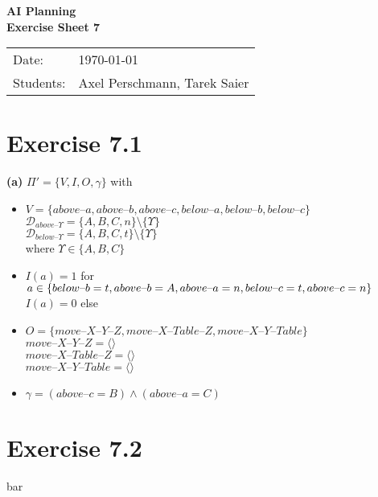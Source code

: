 \documentclass[11pt,a4paper]{article}
\newcommand{\sheetNr}{7}
\newcommand{\h}[0]{\text{--}}
\begin{document}
\begin{center}
\Huge{\textbf{AI Planning}}\\
\LARGE{\textbf{Exercise Sheet \sheetNr}}
\end{center}
\vspace{2cm}
\begin{tabular}{ll}
Date: & \today\\
Students: & Axel Perschmann, Tarek Saier
\end{tabular}

\section*{Exercise 7.1}
\textbf{(a)} $\Pi'=\{V,I,O,\gamma\}$ with\\
\begin{itemize}
\item $V=\{above\h a,above\h b,above\h c,below\h a,below\h b,below\h c\}$\\
$\mathscr{D}_{above\h\Upsilon}=\{A,B,C,n\}\setminus\{\Upsilon\}$\\
$\mathscr{D}_{below\h\Upsilon}=\{A,B,C,t\}\setminus\{\Upsilon\}$\\
where $\Upsilon\in\{A,B,C\}$

\item $I(a)=1$ for $a\in \{below\h b=t,above\h b=A,above\h a=n,\\
below\h c=t,above\h c=n\}$\\
$I(a)=0$ else

\item $O=\{move\h X\h Y\h Z,move\h X\h Table\h Z,move\h X\h Y\h Table\}$\\
$move\h X\h Y\h Z=\langle\rangle$\\
$move\h X\h Table\h Z=\langle\rangle$\\
$move\h X\h Y\h Table=\langle\rangle$

\item $\gamma=(above\h c=B)\land(above\h a=C)$
\end{itemize}

\section*{Exercise 7.2}
bar

\label{lastpage}
\end{document}
